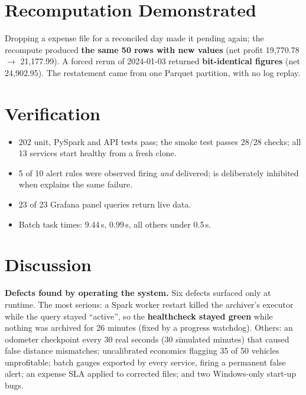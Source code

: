 \section{Recomputation Demonstrated}
\label{sec:recompute}

Dropping a  expense file for a reconciled day made it pending
again; the recompute produced \textbf{the same 50 rows with new values}
(net profit 19,770.78 $\rightarrow$ 21,177.99). A forced rerun of
2024-01-03 returned \textbf{bit-identical figures} (net 24,902.95). The
restatement came from one Parquet partition, with no log replay.

\section{Verification}
\label{sec:alerting-results}

\begin{itemize}
  \item 202 unit, PySpark and API tests pass; the smoke test passes 28/28
        checks; all 13 services start healthy from a fresh clone.
  \item 5 of 10 alert rules were observed firing \emph{and} delivered;
         is deliberately inhibited when
         explains the same failure.
  \item 23 of 23 Grafana panel queries return live data.
  \item Batch task times:  9.44\,s,
         0.99\,s, all others under 0.5\,s.
\end{itemize}

\section{Discussion}
\label{sec:discussion}

\textbf{Defects found by operating the system.} \label{sec:defects}
Six defects surfaced only at runtime. The most
serious: a Spark worker restart killed the archiver's executor while the
query stayed ``active'', so the \textbf{healthcheck stayed green} while
nothing was archived for 26 minutes (fixed by a progress watchdog).
Others: an odometer checkpoint every 30 real seconds (30 simulated
minutes) that caused false distance mismatches; uncalibrated economics
flagging 35 of 50 vehicles unprofitable; batch gauges exported by every
service, firing a permanent false alert; an expense SLA applied to
corrected  files; and two Windows-only start-up bugs.

